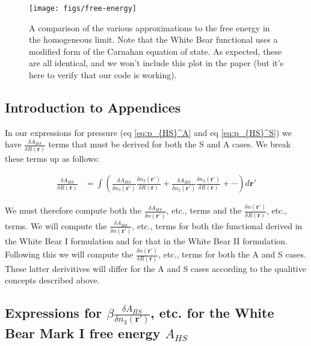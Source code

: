 \documentclass[letterpaper,twocolumn,amsmath,amssymb,jcp,10pt,aip]{revtex4-1}
\begin{document}
\begin{figure}
\texttt{[image: figs/free-energy]}
\caption{A comparison of the various approximations to the free energy
  in the homogeneous limit.  Note that the White Bear functional uses
  a modified form of the Carnahan equation of state.  As expected,
  these are all identical, and we won't include this plot in the paper
  (but it's here to verify that our code is working).}
\label{fig:free-energy}
\end{figure}


\begin{widetext}

\section*{Introduction to Appendices}

In our expressions for pressure (eq \ref{eq:p_{HS}^A} and eq \ref{eq:p_{HS}^S}) we have $\frac{\delta A_{HS}}{\delta R(\mathbf{r})}$ terms that must be derived for both the S and A cases.  We break these terms up as follows:   

  \begin{align}
    \frac{\delta A_{HS}}{\delta R(\mathbf{r})} &=
    \int \left(
    \frac{\delta A_{HS}}{\delta n_3(\mathbf{r}')}
    \frac{\delta n_3(\mathbf{r}')}{\delta R(\mathbf{r})}
    +
    \frac{\delta A_{HS}}{\delta n_2(\mathbf{r}')}
    \frac{\delta n_2(\mathbf{r}')}{\delta R(\mathbf{r})}
    + \cdots
    \right) d\mathbf{r}'
  \end{align}
 

We must therefore compute both the $\frac{\delta A_{HS}}{\delta n(\mathbf{r}')}$, etc., terms and the $\frac{\delta n(\mathbf{r}')}{\delta R(\mathbf{r})}$, etc., terms.  We will compute the $\frac{\delta A_{HS}}{\delta n(\mathbf{r}')}$, etc., terms for both the functional derived in the White Bear I formulation and for that in the White Bear II formulation.  Following this we will compute the $\frac{\delta n(\mathbf{r}')}{\delta R(\mathbf{r})}$, etc., terms for both the A and S cases.  These latter derivitives will differ for the A and S cases according to the qualitive concepts described above. 

\subsection{Expressions for $\beta\frac{\delta A_{HS}}{\delta n_3(\mathbf{r}')}$, etc. for the White Bear Mark I free energy $A_{HS}$}


\end{widetext}
\end{document}
